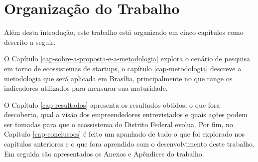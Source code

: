 \section{Organização do Trabalho}
\label{section:organizacao_do_trabalho}

Além desta introdução, este trabalho está organizado em cinco capítulos como descrito a seguir.

O Capítulo \ref{cap-sobre-a-proposta-e-a-metodologia} explora o cenário de pesquisa em torno de ecossistemas de startups, o capítulo \ref{cap-metodologia} descreve a metodologia que será aplicada em Brasília, principalmente no que tange os indicadores utilizados para mensurar sua maturidade.

O Capítulo \ref{cap-resultados} apresenta os resultados obtidos, o que fora descoberto, qual a visão dos empreendedores entrevistados e quais ações podem ser tomadas para que o ecossistema do Distrito Federal evolua. Por fim, no Capítulo \ref{cap-conclusoes} é feito um apanhado de tudo o que foi explorado nos capítulos anteriores e o que fora aprendido com o desenvolvimento deste trabalho. Em seguida são apresentados os Anexos e Apêndices do trabalho.
